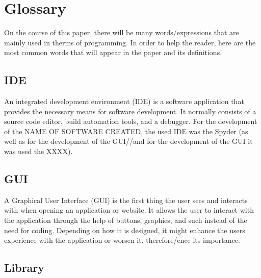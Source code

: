 

\chapter{Glossary}
\label{cha:glossary}


On the course of this paper, there will be many words/expressions that are mainly used in therms of programming. In order to help the reader, here are the most common words that will appear in the paper and its definitions.

\section{IDE} 
\label{sub:ide}

An integrated development environment (IDE) is a software application that provides the necessary means for software development. It normally consists of a source code editor, build automation tools, and a debugger.
For the development of the NAME OF SOFTWARE CREATED, the used IDE was the Spyder (as well as for the development of the GUI//and for the development of the GUI it was used the XXXX).

\section{GUI} 
\label{sub:gui}

A Graphical User Interface (GUI) is the first thing the user sees and interacts with when opening an application or website. It allows the user to interact with the application through the help of buttons, graphics, and such instead of the need for coding.
Depending on how it is designed, it might enhance the users experience with the application or worsen it, therefore/ence its importance.

\section{Library} 
\label{sub:library}


